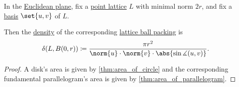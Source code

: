 \begin{proposition}\label{thm:disk_packing_density}
  In the \hyperref[def:euclidean_plane]{Euclidean plane}, fix a \hyperref[def:point_lattice]{point lattice} \( L \) with minimal norm \( 2r \), and fix a \hyperref[def:point_lattice_basis]{basis} \( \set{ u, v } \) of \( L \).

  Then the \hyperref[def:lattice_packing_density]{density} of the corresponding \hyperref[def:lattice_ball_packing]{lattice ball packing} is
  \begin{equation}\label{eq:def:disk_packing_density}
    \delta(L, B(0, r)) \coloneqq \frac {\pi r^2} {\norm{u} \cdot \norm{v} \cdot \abs{\sin\measuredangle(u, v)}}.
  \end{equation}
\end{proposition}
\begin{proof}
  A disk's area is given by \cref{thm:area_of_circle} and the corresponding fundamental parallelogram's area is given by \cref{thm:area_of_parallelogram}.
\end{proof}


